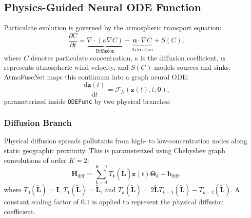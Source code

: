\documentclass[conference]{IEEEtran}
\begin{document}
\subsection{Physics-Guided Neural ODE Function}
Particulate evolution is governed by the atmospheric transport equation:
\begin{equation}
\frac{\partial C}{\partial t} = \underbrace{\nabla \cdot (\kappa \nabla C)}_{\text{Diffusion}} - \underbrace{\boldsymbol{u} \cdot \nabla C}_{\text{Advection}} + S(C),
\label{eq:transport_pde}
\end{equation}
where $C$ denotes particulate concentration, $\kappa$ is the diffusion coefficient, $\boldsymbol{u}$ represents atmospheric wind velocity, and $S(C)$ models sources and sinks. AtmoFuseNet maps this continuum into a graph neural ODE:
\begin{equation}
\frac{\mathrm{d}\boldsymbol{z}(t)}{\mathrm{d}t} = \mathcal{F}_{\mathcal{G}}(\boldsymbol{z}(t), t; \boldsymbol{\theta}),
\label{eq:ode_gov}
\end{equation}
parameterized inside \texttt{ODEFunc} by two physical branches:

\subsubsection{Diffusion Branch}
Physical diffusion spreads pollutants from high- to low-concentration nodes along static geographic proximity. This is parameterized using Chebyshev graph convolutions of order $K = 2$:
\begin{equation}
\boldsymbol{H}_{\text{diff}} = \sum_{k=0}^{K-1} T_k(\widetilde{\boldsymbol{L}}) \boldsymbol{z}(t) \boldsymbol{\Theta}_k + \boldsymbol{b}_{\text{diff}},
\label{eq:cheb_diff}
\end{equation}
where $T_0(\widetilde{\boldsymbol{L}}) = \boldsymbol{I}$, $T_1(\widetilde{\boldsymbol{L}}) = \widetilde{\boldsymbol{L}}$, and $T_k(\widetilde{\boldsymbol{L}}) = 2\widetilde{\boldsymbol{L}} T_{k-1}(\widetilde{\boldsymbol{L}}) - T_{k-2}(\widetilde{\boldsymbol{L}})$. A constant scaling factor of $0.1$ is applied to represent the physical diffusion coefficient.
\end{document}
